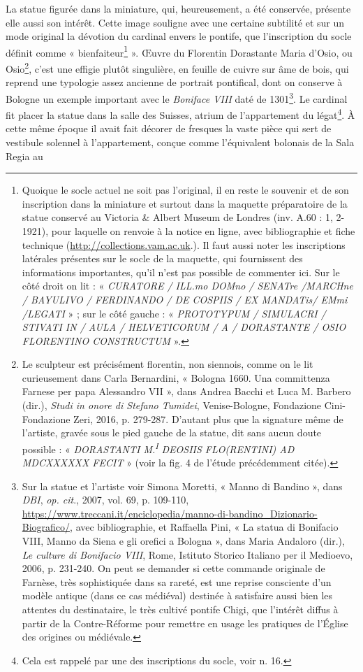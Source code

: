 \documentclass[12pt,twoside,openany]{book}
\begin{document}
La statue figurée dans la miniature, qui, heureusement, a été conservée, présente elle aussi son intérêt. Cette image souligne avec une certaine subtilité et sur un mode original la dévotion du cardinal envers le pontife, que l’inscription du socle définit comme « bienfaiteur\footnote{Quoique le socle actuel ne soit pas l’original, il en reste le souvenir et de son inscription dans la miniature et surtout dans la maquette préparatoire de la statue conservé au Victoria \& Albert Museum de Londres (inv. A.60 : 1, 2-1921), pour laquelle on renvoie à la notice en ligne, avec bibliographie et fiche technique (\href{http://collections.vam.ac.uk}{http://collections.vam.ac.uk}.). Il faut aussi noter les inscriptions latérales présentes sur le socle de la maquette, qui fournissent des informations importantes, qu’il n’est pas possible de commenter ici. Sur le côté droit on lit : « \textit{CURATORE / ILL.mo DOMno / SENATre /MARCHne / BAYULIVO / FERDINANDO / DE COSPIIS / EX MANDATis/ EMmi /LEGATI} » ; sur le côté gauche : « \textit{PROTOTYPUM / SIMULACRI / STIVATI IN / AULA / HELVETICORUM / A / DORASTANTE / OSIO FLORENTINO CONSTRUCTUM} ».} ». Œuvre du Florentin Dorastante Maria d’Osio, ou Osio\footnote{Le sculpteur est précisément florentin, non siennois, comme on le lit curieusement dans Carla Bernardini, « Bologna 1660. Una committenza Farnese per papa Alessandro VII », dans Andrea Bacchi et Luca M. Barbero (dir.), \textit{Studi in onore di Stefano Tumidei}, Venise-Bologne, Fondazione Cini-Fondazione Zeri, 2016, p. 279-287. D’autant plus que la signature même de l’artiste, gravée sous le pied gauche de la statue, dit sans aucun doute possible : « \textit{DORASTANTI M.}\textit{\textsuperscript{I}}\textit{ DEOSIIS FLO(RENTINI) AD MDCXXXXXX FECIT} » (voir la fig. 4 de l’étude précédemment citée).}, c’est une effigie plutôt singulière, en feuille de cuivre sur âme de bois, qui reprend une typologie assez ancienne de portrait pontifical, dont on conserve à Bologne un exemple important avec le \textit{Boniface VIII} daté de 1301\footnote{Sur la statue et l’artiste voir Simona Moretti, « Manno di Bandino », dans \textit{DBI}, \textit{op. cit}., 2007, vol. 69, p. 109-110, \href{https://www.treccani.it/enciclopedia/manno-di-bandino\_Dizionario-Biografico/}{https://www.treccani.it/enciclopedia/manno-di-bandino\_Dizionario-Biografico/}, avec bibliographie, et Raffaella Pini, « La statua di Bonifacio VIII, Manno da Siena e gli orefici a Bologna », dans Maria Andaloro (dir.), \textit{Le culture di Bonifacio VIII}, Rome, Istituto Storico Italiano per il Medioevo, 2006, p. 231-240. On peut se demander si cette commande originale de Farnèse, très sophistiquée dans sa rareté, est une reprise consciente d’un modèle antique (dans ce cas médiéval) destinée à satisfaire aussi bien les attentes du destinataire, le très cultivé pontife Chigi, que l’intérêt diffus à partir de la Contre-Réforme pour remettre en usage les pratiques de l’Église des origines ou médiévale.}. Le cardinal fit placer la statue dans la salle des Suisses, atrium de l’appartement du légat\footnote{Cela est rappelé par une des inscriptions du socle, voir n. 16.}. À cette même époque il avait fait décorer de fresques la vaste pièce qui sert de vestibule solennel à l’appartement, conçue comme l’équivalent bolonais de la Sala Regia au 
\end{document}
